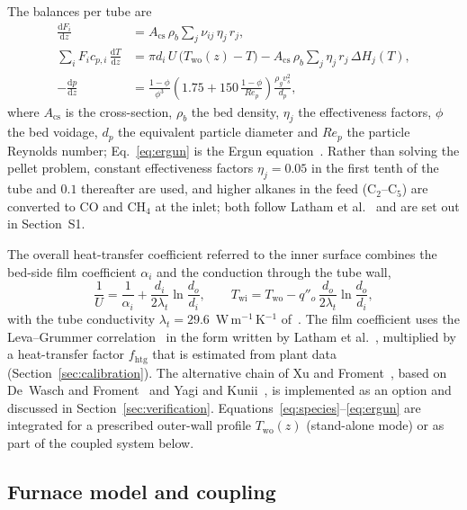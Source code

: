 \documentclass[final,3p,times]{elsarticle}
\begin{document}
The balances per tube are
\begin{align}
\frac{\mathrm{d}F_i}{\mathrm{d}z} &= A_{\mathrm{cs}}\,\rho_b \sum_j \nu_{ij}\,\eta_j\,r_j, \label{eq:species}\\
\sum_i F_i c_{p,i}\,\frac{\mathrm{d}T}{\mathrm{d}z} &= \pi d_i\,U\,\big(T_{\mathrm{wo}}(z) - T\big) - A_{\mathrm{cs}}\,\rho_b \sum_j \eta_j\,r_j\,\Delta H_j(T), \label{eq:energy}\\
-\frac{\mathrm{d}p}{\mathrm{d}z} &= \frac{1-\phi}{\phi^3}\left(1.75 + 150\,\frac{1-\phi}{Re_p}\right)\frac{\rho_g v_s^2}{d_p}, \label{eq:ergun}
\end{align}
where $A_{\mathrm{cs}}$ is the cross-section, $\rho_b$ the bed density, $\eta_j$ the effectiveness factors, $\phi$ the bed voidage, $d_p$ the equivalent particle diameter and $Re_p$ the particle Reynolds number; Eq.~\eqref{eq:ergun} is the Ergun equation~\cite{ergun1952}. Rather than solving the pellet problem, constant effectiveness factors $\eta_j = 0.05$ in the first tenth of the tube and $0.1$ thereafter are used, and higher alkanes in the feed (C$_2$--C$_5$) are converted to CO and CH$_4$ at the inlet; both follow Latham et al.~\cite{latham2011} and are set out in Section~S1.

The overall heat-transfer coefficient referred to the inner surface combines the bed-side film coefficient $\alpha_i$ and the conduction through the tube wall,
\begin{equation}
\frac{1}{U} = \frac{1}{\alpha_i} + \frac{d_i}{2\lambda_t}\ln\frac{d_o}{d_i}, \qquad
T_{\mathrm{wi}} = T_{\mathrm{wo}} - q''_o\,\frac{d_o}{2\lambda_t}\ln\frac{d_o}{d_i},
\label{eq:U}
\end{equation}
with the tube conductivity $\lambda_t = 29.6$~W\,m$^{-1}$\,K$^{-1}$ of~\cite{latham2008}. The film coefficient uses the Leva--Grummer correlation~\cite{leva1948} in the form written by Latham et al.~\cite{latham2011}, multiplied by a heat-transfer factor $f_{\mathrm{htg}}$ that is estimated from plant data (Section~\ref{sec:calibration}). The alternative chain of Xu and Froment~\cite{xu1989b}, based on De~Wasch and Froment~\cite{dewasch1972} and Yagi and Kunii~\cite{yagi1960}, is implemented as an option and discussed in Section~\ref{sec:verification}. Equations~\eqref{eq:species}--\eqref{eq:ergun} are integrated for a prescribed outer-wall profile $T_{\mathrm{wo}}(z)$ (stand-alone mode) or as part of the coupled system below.

\subsection{Furnace model and coupling}
\label{sec:furnace}
\end{document}
